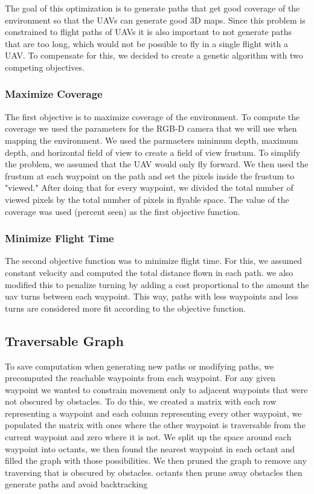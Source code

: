 \documentclass[letterpaper, 10 pt, conference]{ieeeconf}  %
\begin{document}
The goal of this optimization is to generate paths that get good coverage of the environment so that the UAVs can generate good 3D maps. Since this problem is constrained to flight paths of UAVs it is also important to not generate paths that are too long, which would not be possible to fly in a single flight with a UAV. To compensate for this, we decided to create a genetic algorithm with two competing objectives.

\subsubsection{Maximize Coverage}

The first objective is to maximize coverage of the environment. To compute the coverage we used the parameters for the RGB-D camera that we will use when mapping the environment. We used the parmaeters minimum depth, maximum depth, and horizontal field of view to create a field of view frustum. To simplify the problem, we assumed that the UAV would only fly forward. We then used the frustum at each waypoint on the path and set the pixels inside the frustum to "viewed." After doing that for every waypoint, we divided the total number of viewed pixels by the total number of pixels in flyable space. The value of the coverage was used (percent seen) as the first objective function.

\subsubsection{Minimize Flight Time}

The second objective function was to minimize flight time. For this, we assumed constant velocity and computed the total distance flown in each path. we also modified this to penalize turning by adding a cost proportional to the amount the uav turns between each waypoint. This way, paths with less waypoints and less turns are considered more fit according to the objective function.

\subsection{Traversable Graph}

To save computation when generating new paths or modifying paths, we precomputed the reachable waypoints from each waypoint. For any given waypoint we wanted to constrain movement only to adjacent waypoints that were not obscured by obstacles. To do this, we created a matrix with each row representing a waypoint and each column representing every other waypoint, we populated the matrix with ones where the other waypoint is traversable from the current waypoint and zero where it is not. We split up the space around each waypoint into octants, we then found the nearest waypoint in each octant and filled the graph with those possibilities. We then pruned the graph to remove any traversing that is obscured by obstacles.
octants then prune away obstacles then generate paths and avoid backtracking
\end{document}
